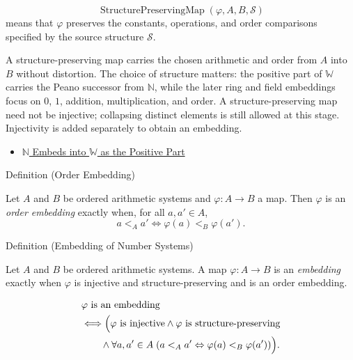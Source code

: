 \begin{remark*}
\[
\operatorname{StructurePreservingMap}(\varphi,A,B,\mathcal{S})
\]
means that $\varphi$ preserves the constants, operations, and order comparisons specified by the source structure $\mathcal{S}$.
\end{remark*}
\begin{remark*}[Interpretation]
A structure-preserving map carries the chosen arithmetic and order from $A$
into $B$ without distortion. The choice of structure matters: the positive
part of $\mathbb{W}$ carries the Peano successor from $\mathbb{N}$, while
the later ring and field embeddings focus on $0$, $1$, addition,
multiplication, and order. A structure-preserving map need not be injective;
collapsing distinct elements is still allowed at this stage. Injectivity is
added separately to obtain an embedding.
\end{remark*}
\begin{dependencies}
\begin{itemize}
\item \hyperref[thm:n-embeds-into-w-as-positive-part]{$\mathbb{N}$ Embeds into $\mathbb{W}$ as the Positive Part}
\end{itemize}
\end{dependencies}
\begin{topicbox}{Definition (Order Embedding)}
\begin{exposition}
Let $A$ and $B$ be ordered arithmetic systems and $\varphi:A\to B$ a map. Then $\varphi$ is an \emph{order embedding} exactly when, for all $a,a'\in A$,
\[
a<_A a' \Longleftrightarrow \varphi(a)<_B\varphi(a').
\]
\end{exposition}
\end{topicbox}
\begin{definitionbox}{Definition (Embedding of Number Systems)}
\begin{definition}
\label{def:number-system-embedding}
Let $A$ and $B$ be ordered arithmetic systems. A map $\varphi:A\to B$ is an \emph{embedding} exactly when $\varphi$ is injective and structure-preserving and is an order embedding.
\end{definition}
\end{definitionbox}
\begin{remark*}
\[
\begin{aligned}
&\varphi \text{ is an embedding}\\
&\Longleftrightarrow \Bigl(\varphi \text{ is injective}\land \varphi \text{ is structure-preserving}\\
&\qquad\land \forall a,a'\in A\;(a<_A a'\Leftrightarrow\varphi(a)<_B\varphi(a'))\Bigr).
\end{aligned}
\]
\end{remark*}
